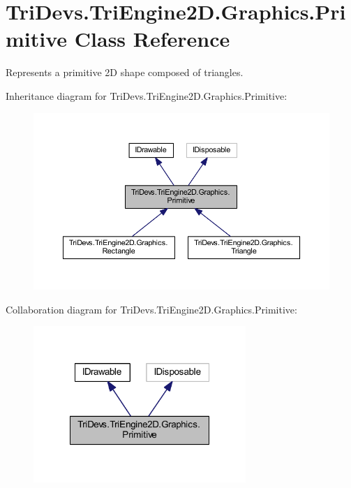 \hypertarget{class_tri_devs_1_1_tri_engine2_d_1_1_graphics_1_1_primitive}{\section{Tri\-Devs.\-Tri\-Engine2\-D.\-Graphics.\-Primitive Class Reference}
\label{class_tri_devs_1_1_tri_engine2_d_1_1_graphics_1_1_primitive}
}


Represents a primitive 2\-D shape composed of triangles.  




Inheritance diagram for Tri\-Devs.\-Tri\-Engine2\-D.\-Graphics.\-Primitive\-:
\nopagebreak
\begin{figure}[H]
\begin{center}
\leavevmode
\includegraphics[width=350pt]{class_tri_devs_1_1_tri_engine2_d_1_1_graphics_1_1_primitive__inherit__graph}
\end{center}
\end{figure}


Collaboration diagram for Tri\-Devs.\-Tri\-Engine2\-D.\-Graphics.\-Primitive\-:
\nopagebreak
\begin{figure}[H]
\begin{center}
\leavevmode
\includegraphics[width=228pt]{class_tri_devs_1_1_tri_engine2_d_1_1_graphics_1_1_primitive__coll__graph}
\end{center}
\end{figure}
